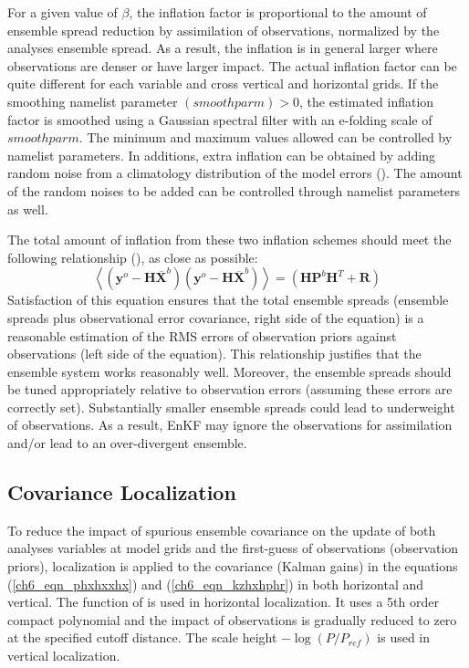 For a given value of $\beta$, the inflation factor is proportional to the amount of ensemble spread reduction by assimilation of observations, normalized by the analyses ensemble spread. As a result, the inflation is in general larger where observations are denser or have larger impact. The actual inflation factor can be quite different for each variable and cross vertical and horizontal grids. If the smoothing namelist parameter $(smoothparm) > 0$, the estimated inflation factor is smoothed using a Gaussian spectral filter with an e-folding scale of $smoothparm$. The minimum and maximum values allowed can be controlled by namelist parameters. In additions, extra inflation can be obtained by adding random noise from a climatology distribution of the model errors (\cite{Whitaker2012}). The amount of the random noises to be added can be controlled through namelist parameters as well. 

The total amount of inflation from these two inflation schemes should meet the following relationship (\cite{Houtekamer2005}), as close as possible:
\begin{equation}
\left< (\pmb{y}^o - \pmb{H}\overline{\pmb{X}}^b )(\pmb{y}^o - \pmb{H}\overline{\pmb{X}}^b) \right> = (\pmb{HP}^{b}\pmb{H}^{T} + \pmb{R})
\end{equation}
Satisfaction of this equation ensures that the total ensemble spreads (ensemble spreads plus observational error covariance, right side of the equation) is a reasonable estimation of the RMS errors of observation priors against observations (left side of the equation). This relationship justifies that the ensemble system works reasonably well. Moreover, the ensemble spreads should be tuned appropriately relative to observation errors (assuming these errors are correctly set). Substantially smaller ensemble spreads could lead to underweight of observations. As a result, EnKF may ignore the observations for assimilation and/or lead to an over-divergent ensemble.

   \subsection{Covariance Localization}

To reduce the impact of spurious ensemble covariance on the update of both analyses variables at model grids and the first-guess of observations (observation priors), localization is applied to the covariance (Kalman gains) in the equations (\ref{ch6_eqn_phxhxxhx}) and (\ref{ch6_eqn_kzhxhphr}) in both horizontal and vertical. The function of \cite{Gaspari1999} is used in horizontal localization. It uses a 5th order compact polynomial and the impact of observations is gradually reduced to zero at the specified cutoff distance. The scale height $-\log{(P/P_{ref})}$ is used in vertical localization.

